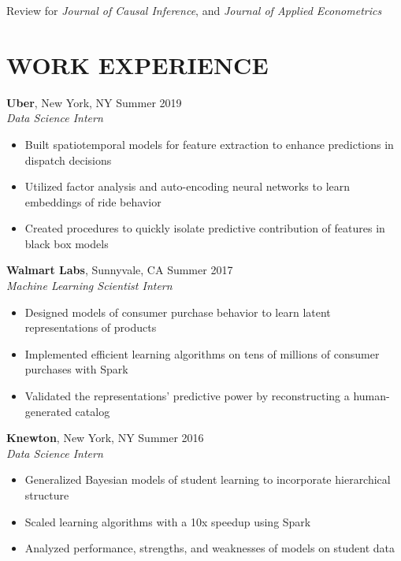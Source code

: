 \documentclass{res}
\begin{document}
\begin{resume}
\vskip -8pt
\hspace{0.2em} Review for {\it Journal of Causal Inference}, and {\it Journal of Applied Econometrics}


\section{WORK EXPERIENCE}
\textbf{Uber}, New York, NY \hfill{Summer 2019}\\
\textit{Data Science Intern}
\begin{itemize}
\item Built spatiotemporal models for feature extraction to enhance predictions in dispatch decisions
\item Utilized factor analysis and auto-encoding neural networks to learn embeddings of ride behavior
\item Created procedures to quickly isolate predictive contribution of features in black box  models
\end{itemize}
\vspace{-2mm}  
\textbf{Walmart Labs}, Sunnyvale, CA \hfill{Summer 2017}\\
\textit{Machine Learning Scientist Intern}
\begin{itemize}
\item Designed models of consumer purchase behavior to learn latent representations of products
\item Implemented efficient learning algorithms on tens of millions of consumer purchases with Spark
\item Validated the representations' predictive power by reconstructing a human-generated catalog
\end{itemize}


\textbf{Knewton}, New York, NY \hfill{Summer 2016}\\
\textit{Data Science Intern}
\begin{itemize}
\item Generalized Bayesian models of student learning to incorporate hierarchical structure 
\item Scaled learning algorithms with a 10x speedup using Spark
\item Analyzed performance, strengths, and weaknesses of models on student data
\end{itemize}


\end{resume}
\end{document}
